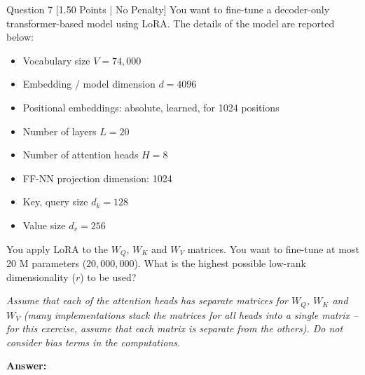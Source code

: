 \documentclass[11pt,a4paper]{article}
\begin{document}
\vspace{0.3cm}

\begin{questionbox}{Question 7 \hfill [1.50 Points | No Penalty]}
You want to fine-tune a decoder-only transformer-based model using LoRA. The details of the model are reported below:
\begin{itemize}[noitemsep]
    \item Vocabulary size $V = 74{,}000$
    \item Embedding / model dimension $d = 4096$
    \item Positional embeddings: absolute, learned, for 1024 positions
    \item Number of layers $L = 20$
    \item Number of attention heads $H = 8$
    \item FF-NN projection dimension: 1024
    \item Key, query size $d_k = 128$
    \item Value size $d_v = 256$
\end{itemize}

\noindent You apply LoRA to the $W_Q$, $W_K$ and $W_V$ matrices. You want to fine-tune at most 20 M parameters ($20{,}000{,}000$). What is the highest possible low-rank dimensionality ($r$) to be used?

\noindent\textit{Assume that each of the attention heads has separate matrices for $W_Q$, $W_K$ and $W_V$ (many implementations stack the matrices for all heads into a single matrix -- for this exercise, assume that each matrix is separate from the others). Do not consider bias terms in the computations.}

\vspace{0.2cm}
\noindent\textbf{Answer:} \underline{\hspace{4cm}}
\end{questionbox}

\vspace{0.3cm}
\end{document}
